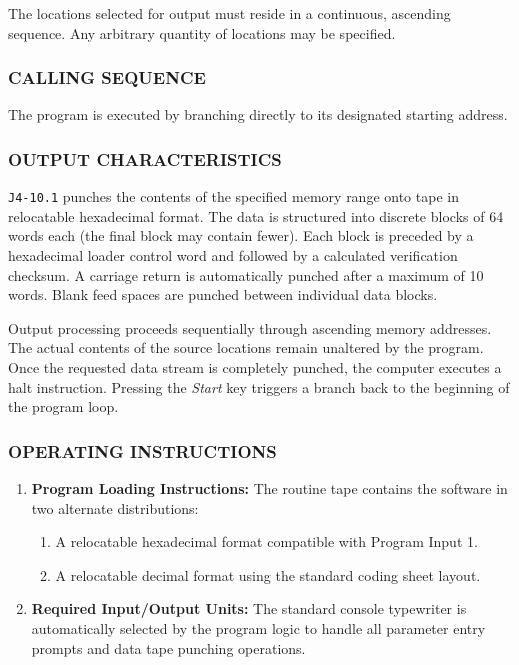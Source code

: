 The locations selected for output must reside in a continuous, ascending sequence. Any arbitrary quantity of locations may be specified.

\subsubsection*{CALLING SEQUENCE}
The program is executed by branching directly to its designated starting address.

\subsubsection*{OUTPUT CHARACTERISTICS}
\texttt{J4-10.1} punches the contents of the specified memory range onto tape in relocatable hexadecimal format. The data is structured into discrete blocks of 64 words each (the final block may contain fewer). Each block is preceded by a hexadecimal loader control word and followed by a calculated verification checksum. A carriage return is automatically punched after a maximum of 10 words. Blank feed spaces are punched between individual data blocks. 

Output processing proceeds sequentially through ascending memory addresses. The actual contents of the source locations remain unaltered by the program. Once the requested data stream is completely punched, the computer executes a halt instruction. Pressing the \textit{Start} key triggers a branch back to the beginning of the program loop.

\subsubsection*{OPERATING INSTRUCTIONS}
\begin{enumerate}
    \item \textbf{Program Loading Instructions:} The routine tape contains the software in two alternate distributions:
    \begin{enumerate}[label=\alph*)]
        \item A relocatable hexadecimal format compatible with Program Input 1.
        \item A relocatable decimal format using the standard coding sheet layout.
    \end{enumerate}
    \item \textbf{Required Input/Output Units:} The standard console typewriter is automatically selected by the program logic to handle all parameter entry prompts and data tape punching operations.
\end{enumerate}
\newpage


